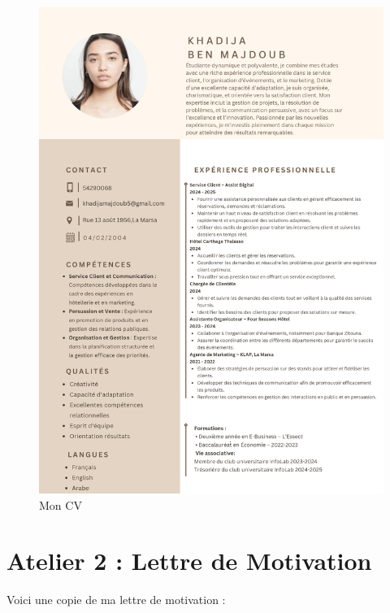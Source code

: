 \documentclass[a4paper,12pt]{article}
\begin{document}
\begin{figure}[H]
    \centering
    \includegraphics[width=\textwidth]{CV.pdf} %
    \caption{Mon CV}
    \label{fig:cv}
\end{figure}

\section*{\color{mygreen} Atelier 2 : Lettre de Motivation}
Voici une copie de ma lettre de motivation :  
\end{document}
